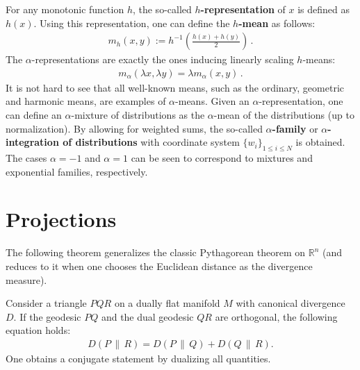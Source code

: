     For any monotonic function $h$, the so-called \textbf{$h$-representation} of $x$ is defined as $h(x)$. Using this representation, one can define the \textbf{$h$-mean} as follows:
    \begin{gather}
        m_h(x,y) := h^{-1}\left(\frac{h(x)+h(y)}{2}\right)\,.
    \end{gather}
    The $\alpha$-representations are exactly the ones inducing linearly scaling $h$-means:
    \begin{gather}
        m_\alpha(\lambda x,\lambda y) = \lambda m_\alpha(x,y)\,.
    \end{gather}
    It is not hard to see that all well-known means, such as the ordinary, geometric and harmonic means, are examples of $\alpha$-means. Given an $\alpha$-representation, one can define an $\alpha$-mixture of distributions as the $\alpha$-mean of the distributions (up to normalization). By allowing for weighted sums, the so-called \textbf{$\alpha$-family} or \textbf{$\alpha$-integration of distributions} with coordinate system $\{w_i\}_{1\leq i\leq N}$ is obtained. The cases $\alpha=-1$ and $\alpha=1$ can be seen to correspond to mixtures and exponential families, respectively.

\section{Projections}

    The following theorem generalizes the classic Pythagorean theorem on $\mathbb{R}^n$ (and reduces to it when one chooses the Euclidean distance as the divergence measure).
    \begin{theorem}[Pythagoras]
        Consider a triangle $PQR$ on a dually flat manifold $M$ with canonical divergence $D$. If the geodesic $PQ$ and the dual geodesic $QR$ are orthogonal, the following equation holds:
        \begin{gather}
            D(P\,\|\,R) = D(P\,\|\,Q) + D(Q\,\|\,R).
        \end{gather}
        One obtains a conjugate statement by dualizing all quantities.
    \end{theorem}

